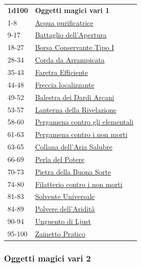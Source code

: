 \begin{multicols}{2}
{{\small\begin{tabularx}{0.45\textwidth}{lX}
\textbf{1d100} & \textbf{Oggetti magici vari 1}\\
1-8 & \hyperlink{Acquapurificatrice}{Acqua purificatrice}\\
9-17 & \hyperlink{Battagliodell'Apertura}{Battaglio dell'Apertura}\\
18-27 & \hyperlink{BorsaConservanteTipoI}{Borsa Conservante Tipo I}\\
28-34 & \hyperlink{CordadaArrampicata}{Corda da Arrampicata}\\
35-43 & \hyperlink{FaretraEfficiente}{Faretra Efficiente}\\
44-48 & \hyperlink{Freccialocalizzante}{Freccia localizzante}\\
49-52 & \hyperlink{BalestradeiDardiArcani}{Balestra dei Dardi Arcani}\\
53-57 & \hyperlink{LanternadellaRivelazione}{Lanterna della Rivelazione}\\
58-60 & \hyperlink{Pergamenacontroglielementali}{Pergamena contro gli elementali}\\
61-63 & \hyperlink{Pergamenacontroinonmorti}{Pergamena contro i non morti}\\
63-65 & \hyperlink{Collanadell'AriaSalubre}{Collana dell'Aria Salubre}\\
66-69 & \hyperlink{PerladelPotere}{Perla del Potere}\\
70-73 & \hyperlink{PietradellaBuonaSorte}{Pietra della Buona Sorte}\\
74-80 & \hyperlink{Filatteriocontroinonmorti}{Filatterio contro i non morti}\\
81-83 & \hyperlink{SolventeUniversale}{Solvente Universale}\\
84-89 & \hyperlink{Polveredell'Aridità}{Polvere dell'Aridità}\\
90-94 & \hyperlink{UnguentodiLjust}{Unguento di Ljust}\\
95-100 & \hyperlink{ZainettoPratico}{Zainetto Pratico}
\end{tabularx}}

\subsubsection{Oggetti magici vari 2}\hypertarget{Oggetti Magici Vari 2}{}


}
\end{multicols}

